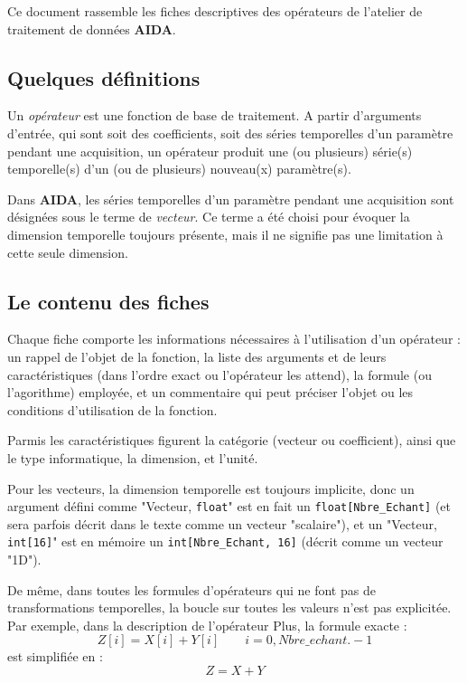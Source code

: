 
Ce document rassemble les fiches descriptives des op\'erateurs
de l'atelier de traitement de donn\'ees {\bf AIDA}.

\subsection*{Quelques d\'efinitions}

Un {\em op\'erateur} est une fonction de base de traitement. A 
partir d'arguments d'entr\'ee, qui sont soit des coefficients, 
soit des s\'eries temporelles d'un param\`etre pendant
une acquisition, un op\'erateur produit une (ou plusieurs) s\'erie(s) temporelle(s)
d'un (ou de plusieurs) nouveau(x) param\`etre(s).

Dans {\bf AIDA}, les s\'eries temporelles d'un param\`etre pendant
une acquisition sont d\'esign\'ees sous le terme de {\em vecteur}. Ce terme
a \'et\'e choisi pour \'evoquer la dimension temporelle toujours
pr\'esente, mais il ne signifie pas une limitation \`a cette seule dimension.

\subsection*{Le contenu des fiches}

Chaque fiche comporte les informations n\'ecessaires \`a l'utilisation
d'un op\'erateur : un rappel de l'objet de la fonction, la liste des
arguments et de leurs caract\'eristiques (dans l'ordre exact ou l'op\'erateur
les attend), la formule (ou l'agorithme) employ\'ee, et un commentaire
qui peut pr\'eciser l'objet ou les conditions d'utilisation de la fonction.

Parmis les caract\'eristiques figurent la cat\'egorie (vecteur ou coefficient),
ainsi que le type informatique, la dimension, et l'unit\'e. 

Pour les vecteurs, la dimension temporelle est toujours implicite, donc un
argument d\'efini comme "Vecteur, {\tt float}" est en fait un
{\tt float[Nbre\_Echant]} (et sera parfois d\'ecrit dans le texte comme
un vecteur "scalaire"), et un "Vecteur, {\tt int[16]}" 
est en m\'emoire un {\tt int[Nbre\_Echant, 16]} (d\'ecrit comme un
vecteur "1D").

De m\^eme, dans toutes les formules d'op\'erateurs qui ne font
pas de transformations temporelles, la boucle sur toutes
les valeurs n'est pas explicit\'ee. Par exemple, dans la description
de l'op\'erateur {\sf Plus}, la formule exacte :
\[ Z[i] = X[i] + Y[i]  \qquad i=0, Nbre\_echant.-1  \]
est simplifi\'ee en :
\[ Z = X + Y\]

